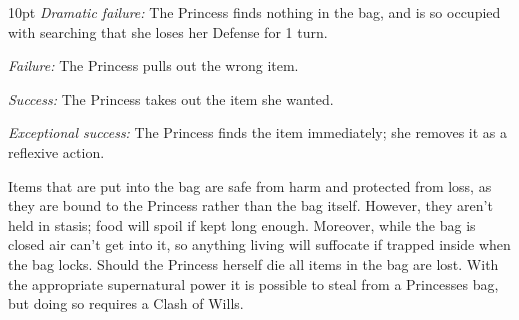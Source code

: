 \begin{myindentpar}{10pt}    \emph{Dramatic failure:} The Princess finds nothing in the bag, and is so occupied with searching that she loses her Defense for 1 turn.

    \emph{Failure:} The Princess pulls out the wrong item.

    \emph{Success:} The Princess takes out the item she wanted.

    \emph{Exceptional success:} The Princess finds the item immediately; she removes it as a reflexive action.\end{myindentpar}

Items that are put into the bag are safe from harm and protected from loss, as they are bound to the Princess rather than the bag itself. However, they aren't held in stasis; food will spoil if kept long enough. Moreover, while the bag is closed air can't get into it, so anything living will suffocate if trapped inside when the bag locks. Should the Princess herself die all items in the bag are lost. With the appropriate supernatural power it is possible to steal from a Princesses bag, but doing so requires a Clash of Wills.

